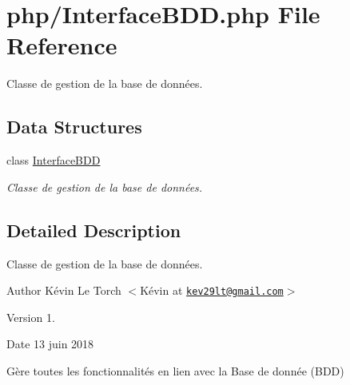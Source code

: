 \hypertarget{_interface_b_d_d_8php}{}\section{php/\+Interface\+B\+DD.php File Reference}
\label{_interface_b_d_d_8php}


Classe de gestion de la base de données.  


\subsection*{Data Structures}
\begin{DoxyCompactItemize}
\item 
class \mbox{\hyperlink{class_interface_b_d_d}{Interface\+B\+DD}}
\begin{DoxyCompactList}\small\item\em Classe de gestion de la base de données. \end{DoxyCompactList}\end{DoxyCompactItemize}


\subsection{Detailed Description}
Classe de gestion de la base de données. 

\begin{DoxyAuthor}{Author}
Kévin Le Torc\textquotesingle{}h $<$Kévin at \href{mailto:kev29lt@gmail.com}{\tt kev29lt@gmail.\+com}$>$ 
\end{DoxyAuthor}
\begin{DoxyVersion}{Version}
1. 
\end{DoxyVersion}
\begin{DoxyDate}{Date}
13 juin 2018
\end{DoxyDate}
Gère toutes les fonctionnalités en lien avec la Base de donnée (B\+DD) 